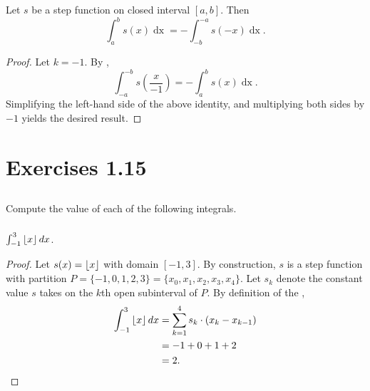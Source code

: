 \documentclass{report}
\begin{document}
\subsection{}%
\label{sub:step-reflection-property}

Let $s$ be a step function on closed interval $[a, b]$.
Then
  $$\int_a^b s(x) \mathop{dx} = -\int_{-b}^{-a} s(-x) \mathop{dx}.$$

\begin{proof}

  Let $k = -1$.
  By ,
    $$\int_{-a}^{-b} s \left( \frac{x}{-1} \right) =
      -\int_a^b s(x) \mathop{dx}.$$
  Simplifying the left-hand side of the above identity, and multiplying both
    sides by $-1$ yields the desired result.

\end{proof}

\section{Exercises 1.15}%
\label{sec:exercises-1.15}

\subsection{}%
\label{sub:exercise-1.15.1}

Compute the value of each of the following integrals.

\subsubsection{}%
\label{ssub:exercise-1.15.1a}

$\int_{-1}^3 \left\lfloor x\right\rfloor \mathop{dx}$.

\begin{proof}

  Let $s(x) = \left\lfloor x\right\rfloor$ with domain $[-1, 3]$.
  By construction, $s$ is a step function with partition
    $P = \{-1, 0, 1, 2, 3\} = \{x_0, x_1, x_2, x_3, x_4\}$.
  Let $s_k$ denote the constant value $s$ takes on the $k$th open subinterval of
    $P$.
  By definition of the ,
    \begin{align*}
      \int_{-1}^3 \left\lfloor x\right\rfloor \mathop{dx}
        & = \sum_{k=1}^4 s_k \cdot (x_k - x_{k-1}) \\
        & = -1 + 0 + 1 + 2 \\
        & = 2.
    \end{align*}

\end{proof}
\end{document}
